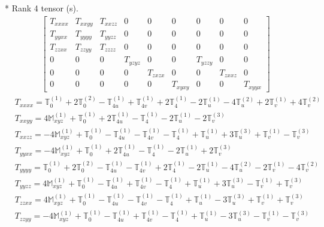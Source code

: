 \documentclass[fleqn,8pt,landscape]{jsarticle}
\begin{document}
* Rank 4 tensor (s).
\begin{align*}
\begin{bmatrix} T_{xxxx} & T_{xxyy} & T_{xxzz} & 0 & 0 & 0 & 0 & 0 & 0 \\ T_{yyxx} & T_{yyyy} & T_{yyzz} & 0 & 0 & 0 & 0 & 0 & 0 \\ T_{zzxx} & T_{zzyy} & T_{zzzz} & 0 & 0 & 0 & 0 & 0 & 0 \\ 0 & 0 & 0 & T_{yzyz} & 0 & 0 & T_{yzzy} & 0 & 0 \\ 0 & 0 & 0 & 0 & T_{zxzx} & 0 & 0 & T_{zxxz} & 0 \\ 0 & 0 & 0 & 0 & 0 & T_{xyxy} & 0 & 0 & T_{xyyx} \end{bmatrix}
\end{align*}
\begin{align*}
& T_{xxxx} = \mathbb{T}_{0}^{(1)} + 2 \mathbb{T}_{0}^{(2)} - \mathbb{T}_{4u}^{(1)} + \mathbb{T}_{4v}^{(1)} + 2 \mathbb{T}_{4}^{(1)} - 2 \mathbb{T}_{u}^{(1)} - 4 \mathbb{T}_{u}^{(2)} + 2 \mathbb{T}_{v}^{(1)} + 4 \mathbb{T}_{v}^{(2)} \\
& T_{xxyy} = 4 \mathbb{M}_{xyz}^{(1)} + \mathbb{T}_{0}^{(1)} + 2 \mathbb{T}_{4u}^{(1)} - \mathbb{T}_{4}^{(1)} - 2 \mathbb{T}_{u}^{(1)} - 2 \mathbb{T}_{v}^{(3)} \\
& T_{xxzz} = - 4 \mathbb{M}_{xyz}^{(1)} + \mathbb{T}_{0}^{(1)} - \mathbb{T}_{4u}^{(1)} - \mathbb{T}_{4v}^{(1)} - \mathbb{T}_{4}^{(1)} + \mathbb{T}_{u}^{(1)} + 3 \mathbb{T}_{u}^{(3)} + \mathbb{T}_{v}^{(1)} - \mathbb{T}_{v}^{(3)} \\
& T_{yyxx} = - 4 \mathbb{M}_{xyz}^{(1)} + \mathbb{T}_{0}^{(1)} + 2 \mathbb{T}_{4u}^{(1)} - \mathbb{T}_{4}^{(1)} - 2 \mathbb{T}_{u}^{(1)} + 2 \mathbb{T}_{v}^{(3)} \\
& T_{yyyy} = \mathbb{T}_{0}^{(1)} + 2 \mathbb{T}_{0}^{(2)} - \mathbb{T}_{4u}^{(1)} - \mathbb{T}_{4v}^{(1)} + 2 \mathbb{T}_{4}^{(1)} - 2 \mathbb{T}_{u}^{(1)} - 4 \mathbb{T}_{u}^{(2)} - 2 \mathbb{T}_{v}^{(1)} - 4 \mathbb{T}_{v}^{(2)} \\
& T_{yyzz} = 4 \mathbb{M}_{xyz}^{(1)} + \mathbb{T}_{0}^{(1)} - \mathbb{T}_{4u}^{(1)} + \mathbb{T}_{4v}^{(1)} - \mathbb{T}_{4}^{(1)} + \mathbb{T}_{u}^{(1)} + 3 \mathbb{T}_{u}^{(3)} - \mathbb{T}_{v}^{(1)} + \mathbb{T}_{v}^{(3)} \\
& T_{zzxx} = 4 \mathbb{M}_{xyz}^{(1)} + \mathbb{T}_{0}^{(1)} - \mathbb{T}_{4u}^{(1)} - \mathbb{T}_{4v}^{(1)} - \mathbb{T}_{4}^{(1)} + \mathbb{T}_{u}^{(1)} - 3 \mathbb{T}_{u}^{(3)} + \mathbb{T}_{v}^{(1)} + \mathbb{T}_{v}^{(3)} \\
& T_{zzyy} = - 4 \mathbb{M}_{xyz}^{(1)} + \mathbb{T}_{0}^{(1)} - \mathbb{T}_{4u}^{(1)} + \mathbb{T}_{4v}^{(1)} - \mathbb{T}_{4}^{(1)} + \mathbb{T}_{u}^{(1)} - 3 \mathbb{T}_{u}^{(3)} - \mathbb{T}_{v}^{(1)} - \mathbb{T}_{v}^{(3)} \\

\end{align*}
\end{document}
